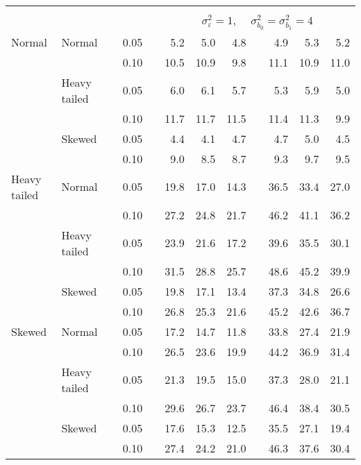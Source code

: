\begin{table}[ht]
\begin{scriptsize}
\begin{center}
\begin{tabular}{ll p{.1cm} c p{.1cm} rrr p{.1cm} rrr}
&&&&&&&&&&&\\
& && && \multicolumn{7}{c}{$\sigma_{\varepsilon}^2 = 1$, \ \ $\sigma_{b_0}^2 = \sigma_{b_1}^2 = 4$} \\ \cline{6-12}
Normal       & Normal       && 0.05 &&   5.2 & 5.0 & 4.8 &   & 4.9 & 5.3 & 5.2 \\ 
             &              && 0.10 &&   10.5 & 10.9 & 9.8 &   & 11.1 & 10.9 & 11.0 \\ 
             & Heavy tailed && 0.05 &&   6.0 & 6.1 & 5.7 &   & 5.3 & 5.9 & 5.0 \\ 
             &              && 0.10 &&   11.7 & 11.7 & 11.5 &   & 11.4 & 11.3 & 9.9 \\ 
             & Skewed       && 0.05 &&   4.4 & 4.1 & 4.7 &   & 4.7 & 5.0 & 4.5 \\ 
             &              && 0.10 &&   9.0 & 8.5 & 8.7 &   & 9.3 & 9.7 & 9.5 \\ 
Heavy tailed & Normal       && 0.05 &&   19.8 & 17.0 & 14.3 &   & 36.5 & 33.4 & 27.0 \\ 
             &              && 0.10 &&   27.2 & 24.8 & 21.7 &   & 46.2 & 41.1 & 36.2 \\ 
             & Heavy tailed && 0.05 &&   23.9 & 21.6 & 17.2 &   & 39.6 & 35.5 & 30.1 \\ 
             &              && 0.10 &&   31.5 & 28.8 & 25.7 &   & 48.6 & 45.2 & 39.9 \\ 
             & Skewed       && 0.05 &&   19.8 & 17.1 & 13.4 &   & 37.3 & 34.8 & 26.6 \\ 
             &              && 0.10 &&   26.8 & 25.3 & 21.6 &   & 45.2 & 42.6 & 36.7 \\ 
Skewed       & Normal       && 0.05 &&   17.2 & 14.7 & 11.8 &   & 33.8 & 27.4 & 21.9 \\ 
             &              && 0.10 &&   26.5 & 23.6 & 19.9 &   & 44.2 & 36.9 & 31.4 \\ 
             & Heavy tailed && 0.05 &&   21.3 & 19.5 & 15.0 &   & 37.3 & 28.0 & 21.1 \\ 
             &              && 0.10 &&   29.6 & 26.7 & 23.7 &   & 46.4 & 38.4 & 30.5 \\ 
             & Skewed       && 0.05 &&   17.6 & 15.3 & 12.5 &   & 35.5 & 27.1 & 19.4 \\ 
             &              && 0.10 &&   27.4 & 24.2 & 21.0 &   & 46.3 & 37.6 & 30.4 \\ 

\hline
\end{tabular}
\end{center}
\end{scriptsize}
\end{table}

